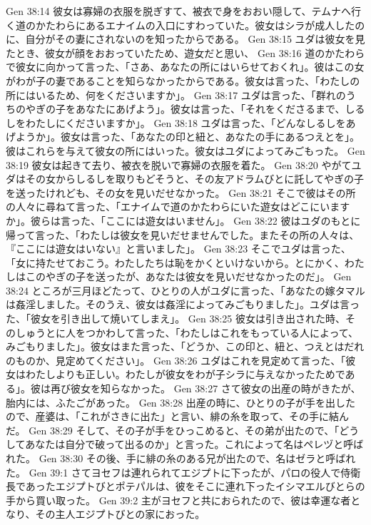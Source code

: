 Gen 38:14  彼女は寡婦の衣服を脱ぎすて、被衣で身をおおい隠して、テムナへ行く道のかたわらにあるエナイムの入口にすわっていた。彼女はシラが成人したのに、自分がその妻にされないのを知ったからである。
Gen 38:15  ユダは彼女を見たとき、彼女が顔をおおっていたため、遊女だと思い、
Gen 38:16  道のかたわらで彼女に向かって言った、「さあ、あなたの所にはいらせておくれ」。彼はこの女がわが子の妻であることを知らなかったからである。彼女は言った、「わたしの所にはいるため、何をくださいますか」。
Gen 38:17  ユダは言った、「群れのうちのやぎの子をあなたにあげよう」。彼女は言った、「それをくださるまで、しるしをわたしにくださいますか」。
Gen 38:18  ユダは言った、「どんなしるしをあげようか」。彼女は言った、「あなたの印と紐と、あなたの手にあるつえとを」。彼はこれらを与えて彼女の所にはいった。彼女はユダによってみごもった。
Gen 38:19  彼女は起きて去り、被衣を脱いで寡婦の衣服を着た。
Gen 38:20  やがてユダはその女からしるしを取りもどそうと、その友アドラムびとに託してやぎの子を送ったけれども、その女を見いだせなかった。
Gen 38:21  そこで彼はその所の人々に尋ねて言った、「エナイムで道のかたわらにいた遊女はどこにいますか」。彼らは言った、「ここには遊女はいません」。
Gen 38:22  彼はユダのもとに帰って言った、「わたしは彼女を見いだせませんでした。またその所の人々は、『ここには遊女はいない』と言いました」。
Gen 38:23  そこでユダは言った、「女に持たせておこう。わたしたちは恥をかくといけないから。とにかく、わたしはこのやぎの子を送ったが、あなたは彼女を見いだせなかったのだ」。
Gen 38:24  ところが三月ほどたって、ひとりの人がユダに言った、「あなたの嫁タマルは姦淫しました。そのうえ、彼女は姦淫によってみごもりました」。ユダは言った、「彼女を引き出して焼いてしまえ」。
Gen 38:25  彼女は引き出された時、そのしゅうとに人をつかわして言った、「わたしはこれをもっている人によって、みごもりました」。彼女はまた言った、「どうか、この印と、紐と、つえとはだれのものか、見定めてください」。
Gen 38:26  ユダはこれを見定めて言った、「彼女はわたしよりも正しい。わたしが彼女をわが子シラに与えなかったためである」。彼は再び彼女を知らなかった。
Gen 38:27  さて彼女の出産の時がきたが、胎内には、ふたごがあった。
Gen 38:28  出産の時に、ひとりの子が手を出したので、産婆は、「これがさきに出た」と言い、緋の糸を取って、その手に結んだ。
Gen 38:29  そして、その子が手をひっこめると、その弟が出たので、「どうしてあなたは自分で破って出るのか」と言った。これによって名はペレヅと呼ばれた。
Gen 38:30  その後、手に緋の糸のある兄が出たので、名はゼラと呼ばれた。
Gen 39:1  さてヨセフは連れられてエジプトに下ったが、パロの役人で侍衛長であったエジプトびとポテパルは、彼をそこに連れ下ったイシマエルびとらの手から買い取った。
Gen 39:2  主がヨセフと共におられたので、彼は幸運な者となり、その主人エジプトびとの家におった。
